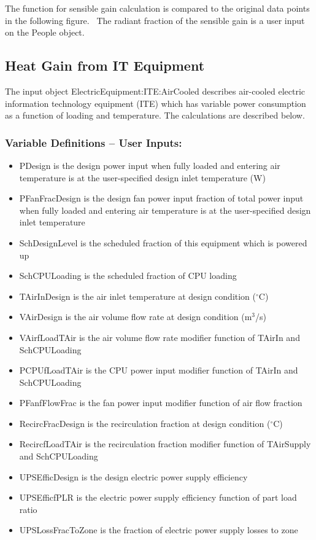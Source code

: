 The function for sensible gain calculation is compared to the original data points in the following figure.~ The radiant fraction of the sensible gain is a user input on the People object.

\subsection{Heat Gain from IT Equipment}\label{heat-gain-from-it-equipment}

The input object ElectricEquipment:ITE:AirCooled describes air-cooled electric information technology equipment (ITE) which has variable power consumption as a function of loading and temperature. The calculations are described below.

\subsubsection{Variable Definitions -- User Inputs:}\label{variable-definitions-user-inputs}

\begin{itemize}
\tightlist
\item
  PDesign is the design power input when fully loaded and entering air temperature is at the user-specified design inlet temperature (W)
\item
  PFanFracDesign is the design fan power input fraction of total power input when fully loaded and entering air temperature is at the user-specified design inlet temperature
\item
  SchDesignLevel is the scheduled fraction of this equipment which is powered up
\item
  SchCPULoading is the scheduled fraction of CPU loading
\item
  TAirInDesign is the air inlet temperature at design condition (\(^{\circ}\)C)
\item
  VAirDesign is the air volume flow rate at design condition (m\(^3\)/s)
\item
  VAirfLoadTAir is the air volume flow rate modifier function of TAirIn and SchCPULoading
\item
  PCPUfLoadTAir is the CPU power input modifier function of TAirIn and SchCPULoading
\item
  PFanfFlowFrac is the fan power input modifier function of air flow fraction
\item
  RecircFracDesign is the recirculation fraction at design condition (\(^{\circ}\)C)
\item
  RecircfLoadTAir is the recirculation fraction modifier function of TAirSupply and SchCPULoading
\item
  UPSEfficDesign is the design electric power supply efficiency
\item
  UPSEfficfPLR is the electric power supply efficiency function of part load ratio
\item
  UPSLossFracToZone is the fraction of electric power supply losses to zone
\end{itemize}

